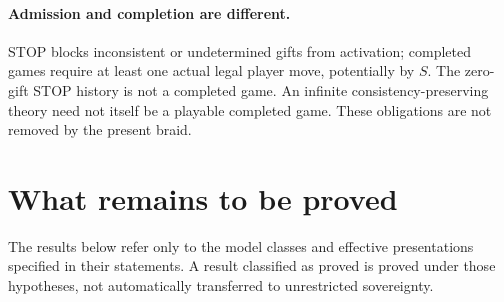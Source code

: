 \documentclass[11pt,letterpaper]{article}
\theoremstyle{definition}\newtheorem{definition}[theorem]{Definition}\newtheorem{example}[theorem]{Example}
\theoremstyle{remark}\newtheorem{remark}[theorem]{Remark}
\begin{document}
\paragraph{Admission and completion are different.} STOP blocks inconsistent or undetermined gifts from activation; completed games require at least one actual legal player move, potentially by $S$. The zero-gift STOP history is not a completed game. An infinite consistency-preserving theory need not itself be a playable completed game. These obligations are not removed by the present braid.

\section{What remains to be proved}\label{sec:status-braid}
The results below refer only to the model classes and effective presentations
specified in their statements. A result classified as proved is proved under
those hypotheses, not automatically transferred to unrestricted sovereignty.
\end{document}
